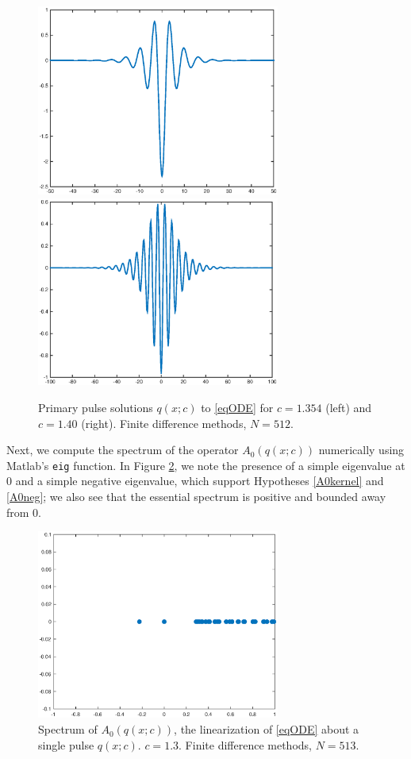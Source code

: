 \documentclass[12pt]{article}
\begin{document}
\begin{figure}[H]
\centering
\includegraphics[width=8cm]{single1354.eps}
\includegraphics[width=8cm]{single14.eps}
\label{fig:single1}
\caption{Primary pulse solutions $q(x;c)$ to \eqref{eqODE} for $c = 1.354$ (left) and $c = 1.40$ (right). Finite difference methods, $N = 512$.}
\end{figure}

Next, we compute the spectrum of the operator $A_0(q(x; c))$ numerically using Matlab's \texttt{eig} function. In Figure \ref{fig:specA0}, we note the presence of a simple eigenvalue at 0 and a simple negative eigenvalue, which support Hypotheses \ref{A0kernel} and \ref{A0neg}; we also see that the essential spectrum is positive and bounded away from 0.

\begin{figure}[H]
\centering
\label{fig:specA0}
\includegraphics[width=8cm]{specA0.eps}
\caption{Spectrum of $A_0(q(x; c))$, the linearization of \eqref{eqODE} about a single pulse $q(x;c)$. $c = 1.3$. Finite difference methods, $N = 513$.}
\end{figure}
\end{document}
